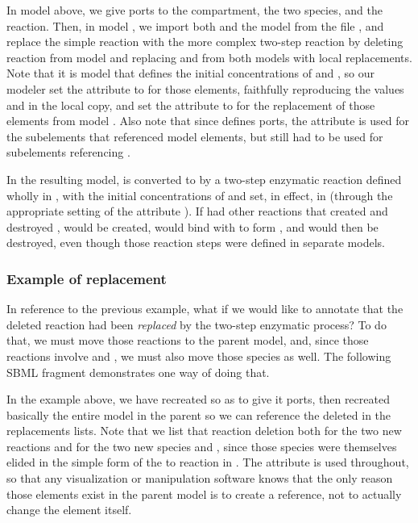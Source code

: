 
In model  above, we give ports to the compartment, the two
species, and the reaction.  Then, in model , we import
both  and the model  from the file
, and replace the simple reaction with the more
complex two-step reaction by deleting reaction  from model
 and replacing  and  from both models with
local replacements.  Note that it is model  that defines the
initial concentrations of  and , so our modeler set the
attribute  to  for those elements, faithfully
reproducing the values  and  in the local copy, and set
the attribute  to  for the replacement of
those elements from model .  Also note that since
 defines ports, the  attribute is used for the
subelements that referenced  model elements, but
 still had to be used for subelements referencing
.

In the resulting model,  is converted to  by a two-step
enzymatic reaction defined wholly in , with the initial
concentrations of  and  set, in effect, in 
(through the appropriate setting of the attribute ).
If  had other reactions that created  and destroyed
,  would be created, would bind with  to form
, and  would then be destroyed, even though those reaction
steps were defined in separate models.


\subsubsection{Example of replacement}

In reference to the previous example, what if we would like to annotate
that the deleted reaction had been \emph{replaced} by the two-step
enzymatic process?  To do that, we must move those reactions to the
parent model, and, since those reactions involve  and ,
we must also move those species as well.  The following SBML fragment
demonstrates one way of doing that.


In the example above, we have recreated  so as to give it
ports, then recreated basically the entire model in the parent
 so we can reference the deleted  in the
replacements lists.  Note that we list that reaction deletion both for
the two new reactions and for the two new species  and ,
since those species were themselves elided in the simple form of the
 to  reaction in .  The attribute
 is used throughout, so that any visualization or
manipulation software knows that the only reason those elements exist in
the parent model is to create a reference, not to actually change the
element itself.
